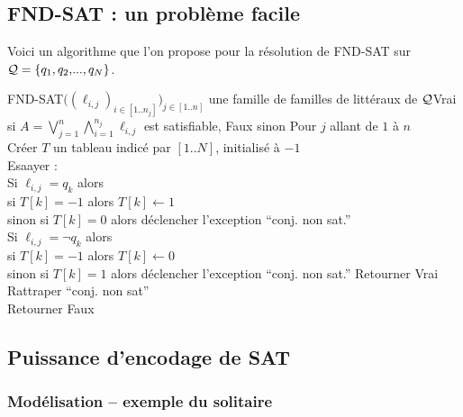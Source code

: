 	\subsection{\textsf{FND-SAT} : un problème facile}
		
		Voici un algorithme que l'on propose pour la résolution de \textsf{FND-SAT} sur \(\cal{Q} = \{q_1,q_2, \!..., q_N\}\).
		
		\pagebreak
		\begin{algo}{FND-SAT}{\(\big(\!(\ell_{i,j})_{i \in [1..n_j]}\big)_{j \in [1..n]}\) une famille de familles de littéraux de \(\cal{Q}\)}{Vrai si \(\displaystyle A = \bigvee_{j=1}^n \bigwedge_{i=1}^{n_j} \ell_{i,j}\) est satisfiable, Faux sinon}{}
			Pour \(j\) allant de \(1\) à \(n\) \\ \Indp
				Créer \(T\) un tableau indicé par \([1..N]\), initialisé à \(-1\) \\
				Esaayer : \\\Indp
					Si \(\ell_{i,j} = q_k\) alors \\ \Indp
						si \(T[k] = -1\) alors \(T[k] \gets 1\) \\
						sinon si \(T[k] = 0\) alors déclencher l'exception ``conj. non sat.'' \\ \Indm
					Si \(\ell_{i,j}= \neg q_k\) alors \\ \Indp
						si \(T[k] = -1\) alors \(T[k] \gets 0\) \\
						sinon si \(T[k] = 1\) alors déclencher l'exception ``conj. non sat.'' \Indm
					Retourner Vrai \\ \Indm
				Rattraper ``conj. non sat'' \\ \Indm
			Retourner Faux
		\end{algo}
		
		
	\subsection{Puissance d'encodage de \textsf{SAT}}
	
		\subsubsection{Modélisation -- exemple du solitaire}
			
			
			

